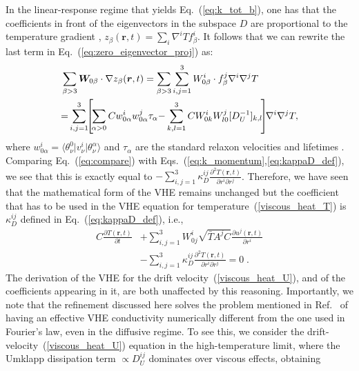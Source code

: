 \documentclass[
prb,
twocolumn,
superscriptaddress,
 amsmath,amssymb,
 aps,
longbibliography,
]{revtex4-2}
\begin{document}
In the linear-response regime that yields Eq.~(\ref{eq:k_tot_b}), one has that the coefficients in front of the eigenvectors in the subspace $D$ are proportional to the temperature gradient \cite{cepellotti_thermal_2016},
$z_\beta(\bm{r},t)= \sum_i \nabla^i T f^i_\beta $.
It follows that we can rewrite the last term in Eq.~(\ref{eq:zero_eigenvector_proj}) as:
\begin{equation}
  \begin{split}
&\sum_{\beta>3} \bm{W}_{0 \beta}\cdot \nabla z_\beta(\bm{r},t)=
\sum_{\beta>3}\sum_{i,j=1}^3 {W}^i_{0 \beta}\cdot f^j_\beta \nabla^i\nabla^j T\\
&{=}
\sum_{i,j=1}^3\!\!\left[\!\sum_{\alpha>0}C {w}^i_{0 \alpha}{w}^j_{0 \alpha} \tau_\alpha {-}
\sum_{k,l=1}^3 C{W}^i_{0 k}{W}^j_{l0} [D_U^{-1}]_{k,l}\!\right]\!\!\nabla^i\nabla^j T,
  \end{split}
  \raisetag{22mm}
  \label{eq:compare}
\end{equation}
where $w^i_{0\alpha}= \langle \theta^0_\nu \vert v^i_\nu \vert \theta^\alpha_\nu\rangle$ and $\tau_\alpha$ are the standard relaxon velocities and lifetimes \cite{cepellotti_thermal_2016,Simoncelli2020}.
Comparing Eq.~(\ref{eq:compare}) with Eqs.~(\ref{eq:k_momentum},\ref{eq:kappaD_def}), we see that this is exactly equal to $-\sum_{i,j=1}^3 \kappa^{ij}_D \frac{\partial^2 T(\bm{r},t)}{\partial r^i\partial r^j} $.
Therefore, we have seen that the mathematical form of the VHE remains unchanged but the coefficient that has to be used in the VHE equation for temperature~(\ref{viscous_heat_T}) is $\kappa^{ij}_D$ defined in Eq.~(\ref{eq:kappaD_def}), i.e.,
\begin{equation}
\begin{aligned}
C \frac{\partial T(\bm{r},t)}{\partial t}
  &+ \sum_{i,j=1}^3  W_{0j}^i \sqrt{\bar{T}A^j C} \frac{\partial u^j(\bm{r},t)}{\partial r^i} \\
  & - \sum_{i,j=1}^3 \kappa^{ij}_D \frac{\partial^2 T(\bm{r},t)}{\partial r^i\partial r^j} = 0 \;.
\label{eq:mesoscopic_energy}
\end{aligned}
\end{equation}
The derivation of the VHE for the drift velocity~(\ref{viscous_heat_U}), and of the coefficients appearing in it, are both unaffected by this reasoning.
Importantly, we note that the refinement discussed here solves the problem mentioned in Ref.~\cite{Simoncelli2020} of having an effective VHE conductivity numerically different from the one used in Fourier's law, even in the diffusive regime.
To see this, we consider the drift-velocity~(\ref{viscous_heat_U}) equation in the high-temperature limit, where the Umklapp dissipation term $\propto D_U^{ij}$ dominates over viscous effects, obtaining
\end{document}
